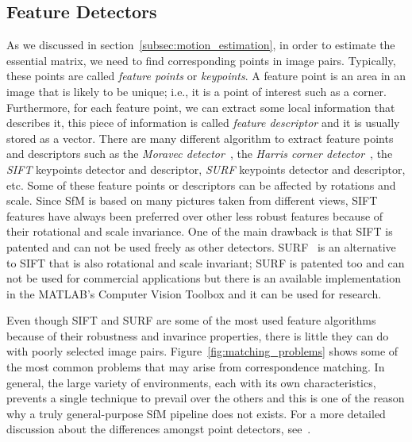 \subsection{Feature Detectors}
As we discussed in section~\ref{subsec:motion_estimation}, in order to estimate
the essential matrix, we need to find corresponding points in image pairs.
Typically, these points are called \textit{feature points} or \textit{keypoints}.
%
A feature point is an area in an image that is likely to be unique; i.e., it is a point of interest such as a corner.
%
Furthermore, for each feature point, we can extract some local information that describes it, this piece of information is called \textit{feature descriptor} and it is usually stored as a vector.
%
There are many different algorithm to extract feature points and descriptors such as the 
\emph{Moravec detector}~\cite{moravec1980obstacle}, the \emph{Harris
corner detector}~\cite{harris1988combined}, the
\emph{SIFT} keypoints detector and descriptor\cite{lowe1999object}, \emph{SURF} keypoints detector and descriptor\cite{bay2006surf}, etc.
%
Some of these feature points or descriptors can be affected by rotations and scale. Since SfM is based on many pictures taken from different views, SIFT features have always been 
preferred over other less robust features because of their rotational and scale
invariance. One of the main drawback is that SIFT is patented and can not be used freely as other detectors.
%
SURF~\cite{bay2006surf} is an alternative to SIFT that is also
rotational and scale invariant; SURF is patented too and 
can not be used for commercial applications but there is an available 
implementation in the MATLAB's Computer Vision Toolbox and it can be 
used for research.

Even though SIFT and SURF are some of the most used feature algorithms 
because of their robustness and invarince properties, there is little they can
do with poorly selected image pairs. Figure~\ref{fig:matching_problems} shows 
some of the most common problems that may arise from correspondence matching.
In general, the large variety of environments, each with its own characteristics, 
prevents a single technique to prevail over the others and this is one of 
the reason why a truly general-purpose SfM pipeline does not exists.
For a more detailed discussion about the differences amongst point detectors, 
see~\cite{schmidt2010evaluation, govender2009evaluation}.

